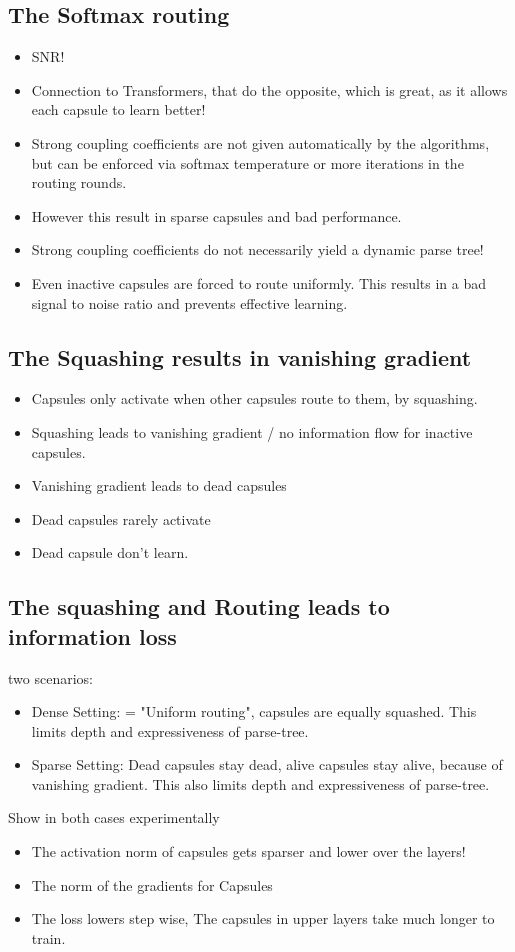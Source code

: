 \documentclass{article}
\begin{document}
\subsection{The Softmax routing}

\begin{itemize}
	\item SNR!
	\item Connection to Transformers, that do the opposite, which is great, as it allows each capsule to learn better!
	\item Strong coupling coefficients are not given automatically by the algorithms, but can be enforced via softmax temperature or more iterations in the routing rounds.
	\item However this result in sparse capsules and bad performance.
	\item Strong coupling coefficients do not necessarily yield a dynamic parse tree!
	\item Even inactive capsules are forced to route uniformly. This results in a bad signal to noise ratio and prevents effective learning.
\end{itemize}

\subsection*{The Squashing results in vanishing gradient}
\begin{itemize}
	\item Capsules only activate when other capsules route to them, by squashing.
	\item Squashing leads to vanishing gradient / no information flow for inactive capsules.
	\item Vanishing gradient leads to dead capsules
	\item Dead capsules rarely activate
	\item Dead capsule don't learn.
\end{itemize}

\subsection*{The squashing and Routing leads to information loss}
two scenarios:
\begin{itemize}
	\item Dense Setting: = "Uniform routing", capsules are equally squashed. This limits depth and expressiveness of parse-tree.
	\item Sparse Setting: Dead capsules stay dead, alive capsules stay alive, because of vanishing gradient. This also limits depth and expressiveness of parse-tree.
\end{itemize}
Show in both cases experimentally
\begin{itemize}
	\item The activation norm of capsules gets sparser and lower over the layers!
	\item The norm of the gradients for Capsules
	\item The loss lowers step wise, The capsules in upper layers take much longer to train.
\end{itemize}
\end{document}
